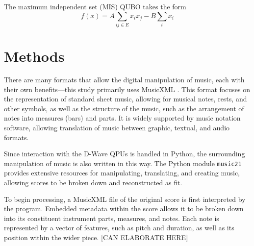 \documentclass[aps,pra,10pt,twocolumn]{revtex4-2}
\begin{document}
The maximum independent set (MIS) QUBO takes the form
\begin{equation}
    f(x)=A\sum_{ij\in E}x_ix_j-B\sum_i x_i
    \label{eq:MIS}
\end{equation}








\newpage
\section{Methods}

There are many formats that allow the digital manipulation of music, each with their own benefits—this study primarily uses MusicXML \cite{musicxml}. This format focuses on the representation of standard sheet music, allowing for musical notes, rests, and other symbols, as well as the structure of the music, such as the arrangement of notes into measures (bars) and parts. It is widely supported by music notation software, allowing translation of music between graphic, textual, and audio formats.

Since interaction with the D-Wave QPUs is handled in Python, the surrounding manipulation of music is also written in this way. The Python module \verb|music21| provides extensive resources for manipulating, translating, and creating music, allowing scores to be broken down and reconstructed as fit.

To begin processing, a MusicXML file of the original score is first interpreted by the program. Embedded metadata within the score allows it to be broken down into its constituent instrument parts, measures, and notes. Each note is represented by a vector of features, such as pitch and duration, as well as its position within the wider piece. [CAN ELABORATE HERE]
\end{document}
